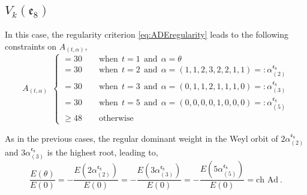 \subsection{$V_k(\mathfrak{e}_8)$}
In this case, the regularity criterion \eqref{eq:ADEregularity} leads to the following constraints on $A_{(t,\alpha)}$,
\begin{equation} \label{eq:Atconste8}
    A_{(t,\alpha)} \ \ \begin{cases}
        = 30 \qquad \text{when} \ \ t = 1 \ \ \text{and} \ \ \alpha = \theta \\ = 30 \qquad \text{when} \ \ t = 2 \ \ \text{and} \ \ \alpha = (1,1,2,3,2,2,1,1) =: \alpha^{\mathfrak{e}_8}_{(2)} \\ = 30 \qquad \text{when} \ \ t = 3 \ \ \text{and} \ \ \alpha = (0,1,1,2,1,1,1,0) =: \alpha^{\mathfrak{e}_8}_{(3)} \\ = 30 \qquad \text{when} \ \ t = 5 \ \ \text{and} \ \ \alpha = (0,0,0,0,1,0,0,0) =: \alpha^{\mathfrak{e}_8}_{(5)} \\ \geqslant 48 \qquad \text{otherwise}
    \end{cases}
\end{equation}


As in the previous cases, the regular dominant weight in the Weyl orbit of $2\alpha^{\mathfrak{e}_8}_{(2)}$ and $3\alpha^{\mathfrak{e}_8}_{(3)}$ is the highest root, leading to, 
\begin{equation}
    \frac{E(\theta)}{E(0)} = -\frac{E(2\alpha^{\mathfrak{e}_8}_{(2)})}{E(0)} = -\frac{E(3\alpha^{\mathfrak{e}_8}_{(3)})}{E(0)} = -\frac{E(5\alpha^{\mathfrak{e}_8}_{(5)})}{E(0)} = \text{ch Ad}~.
\end{equation}

